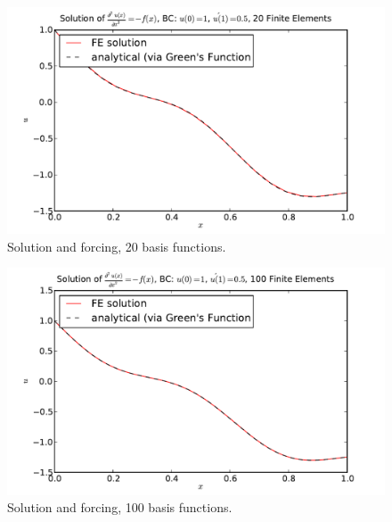 \documentclass[10pt]{article}
\begin{document}
\begin{figure}[ht]
    \centering
    \includegraphics[width=\columnwidth,keepaspectratio=true]{./hw7-solution_and_forcing-N20.pdf}
    \caption{Solution and forcing, 20 basis functions.}
    \label{fig:sf20}
\end{figure}

\begin{figure}[ht]
    \centering
    \includegraphics[width=\columnwidth,keepaspectratio=true]{./hw7-solution_and_forcing-N100.pdf}
    \caption{Solution and forcing, 100 basis functions.}
    \label{fig:sf100}
\end{figure}

\pagebreak
\end{document}
